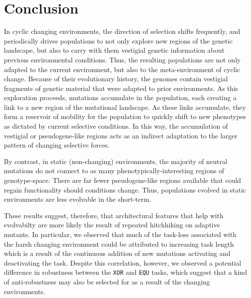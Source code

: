 \documentclass[PhD]{msu-thesis}
\begin{document}

\section{Conclusion}
In cyclic changing environments, the direction of selection shifts frequently, and periodically drives populations to not only explore new regions of the genetic landscape, but also to carry with them vestigial genetic information about previous environmental conditions. Thus, the resulting populations are not only adapted to the current environment, but also to the meta-environment of cyclic change. Because of their evolutionary history, the genomes contain vestigial fragments of genetic material that were adapted to prior environments. As this exploration proceeds, mutations accumulate in the population, each creating a link to a new region of the mutational landscape. As these links accumulate, they form a reservoir of mobility for the population to quickly shift to new phenotypes as dictated by current selective conditions. In this way, the accumulation of vestigial or pseudogene-like regions acts as an indirect adaptation to the larger pattern of changing selective forces. 

By contrast, in static (non-changing) environments, the majority of neutral mutations do not connect to as many phenotypically-interesting regions of genotype-space. There are far fewer pseudogene-like regions available that could regain functionality should conditions change. Thus, populations evolved in static environments are less evolvable in the short-term.

These results suggest, therefore, that architectural features that help with evolvabilty are more likely the result of repeated hitchhiking on adaptive mutants. In particular, we observed that much of the task-loss associated with the harsh changing environment could be attributed to increasing task length which is a result of the continuous addition of new mutations activating and deactivating the task. Despite this correlation, however, we observed a potential difference in robustness between the \texttt{XOR} and \texttt{EQU} tasks, which suggest that a kind of anti-robustness may also be selected for as a result of the changing environments.
\end{document}

